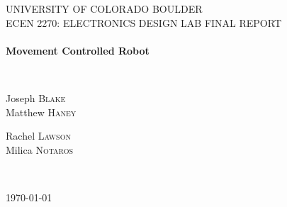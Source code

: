 \begin{titlepage}
\begin{center}


\textsc{\Large UNIVERSITY OF COLORADO BOULDER}\\[1.5cm]

\textsc{\large ECEN 2270: ELECTRONICS DESIGN LAB FINAL REPORT}\\[0.5cm]

\HRule \\[0.4cm]
{ \LARGE \bfseries Movement Controlled Robot \\ [0.4cm] }

\HRule \\[1.5cm]

\noindent
\begin{minipage}{0.4\textwidth}
\begin{flushleft} \large
Joseph \textsc{Blake}\\
Matthew \textsc{Haney}
\end{flushleft}
\end{minipage}%
\begin{minipage}{0.4\textwidth}
\begin{flushright} \large
Rachel \textsc{Lawson}\\
Milica \textsc{Notaros}
\end{flushright}
\end{minipage}\\[1.5cm]

\vfill

{\large \today}

\end{center}

\end{titlepage}
